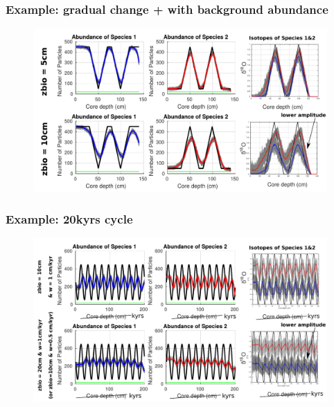 \documentclass{beamer}
\begin{document}
\begin{frame}
\frametitle{Example: gradual change + with background abundance}
\begin{figure}[hbtp]
\hspace*{-0.8cm}\includegraphics[width=1.1\textwidth]{figures/gradualchange2_5+10cm_background.pdf}%
\end{figure}
\end{frame}

\begin{frame}
\frametitle{Example: 20kyrs cycle}
\begin{figure}[hbtp]
\hspace*{-0.8cm}\includegraphics[width=1.1\textwidth]{figures/20kyrcycle_10+20cm_background.pdf}%
\end{figure}
\end{frame}
\end{document}
